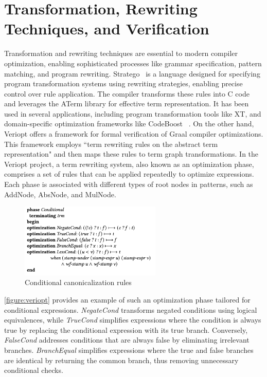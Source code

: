 \newpage
\section{Transformation, Rewriting Techniques, and Verification}
Transformation and rewriting techniques are essential to modern compiler optimization, enabling sophisticated processes like grammar specification, pattern matching, and program rewriting. Stratego~\cite{Eelco2001} is a language designed for specifying program transformation systems using rewriting strategies, enabling precise control over rule application. The compiler transforms these rules into C code and leverages the ATerm library for effective term representation. It has been used in several applications, including program transformation tools like XT, and domain-specific optimization frameworks like CodeBoost ~\cite{Eelco2001}. On the other hand, Veriopt \cite{Webb2023} offers a framework for formal verification of Graal compiler optimizations. This framework employs  ``term rewriting rules on the abstract term representation" \cite{Webb2023} and then maps these rules to term graph transformations. In the Veriopt project, a term rewriting system, also known as an optimization phase, comprises a set of rules that can be applied repeatedly to optimize expressions. Each phase is associated with different types of root nodes in patterns, such as AddNode, AbsNode, and MulNode. 

\begin{figure}[h]
    \centering
    \includegraphics[width=0.6\textwidth]{Packages/veriopt.png}
    \caption{Conditional canonicalization rules \cite{Webb2023}}
    \label{figure:veriopt}
\end{figure}

\autoref{figure:veriopt} provides an example of such an optimization phase tailored for conditional expressions. \textit{NegateCond} transforms negated conditions using logical equivalences, while \textit{TrueCond} simplifies expressions where the condition is always true by replacing the conditional expression with its true branch. Conversely, \textit{FalseCond} addresses conditions that are always false by eliminating irrelevant branches. \textit{BranchEqual} simplifies expressions where the true and false branches are identical by returning the common branch, thus removing unnecessary conditional checks.

